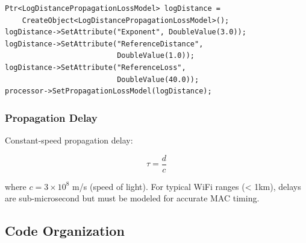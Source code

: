 \begin{lstlisting}[style=cpp, caption={Log-distance model for indoor WiFi}]
Ptr<LogDistancePropagationLossModel> logDistance = 
    CreateObject<LogDistancePropagationLossModel>();
logDistance->SetAttribute("Exponent", DoubleValue(3.0));
logDistance->SetAttribute("ReferenceDistance", 
                          DoubleValue(1.0));
logDistance->SetAttribute("ReferenceLoss", 
                          DoubleValue(40.0));
processor->SetPropagationLossModel(logDistance);
\end{lstlisting}

\subsubsection{Propagation Delay}

Constant-speed propagation delay:

\begin{equation}
\tau = \frac{d}{c}
\end{equation}

where $c = 3 \times 10^8$ m/s (speed of light). For typical WiFi ranges (< 1km), delays are sub-microsecond but must be modeled for accurate MAC timing.

\subsection{Code Organization}

